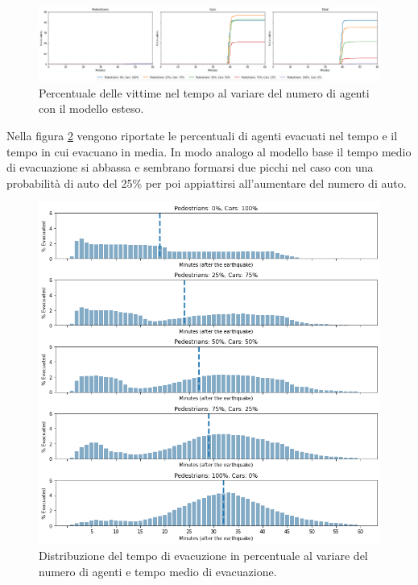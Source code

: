 \begin{figure}[ht]
    \centering
    \includegraphics[width=\textwidth]{images/analisi/new-casualties.png}
    \caption{Percentuale delle vittime nel tempo al variare del numero di agenti con il modello esteso.}
    \label{fig:analisi-new-casualties}
\end{figure}


Nella figura \ref{fig:analisi-new-evtimes} vengono riportate le percentuali di agenti evacuati nel tempo
e il tempo in cui evacuano in media.
%
In modo analogo al modello base il tempo medio di evacuazione si abbassa e sembrano formarsi due picchi nel caso con una probabilità di auto del 25\% per poi appiattirsi
all'aumentare del numero di auto.


\begin{figure}
    \centering
    \includegraphics[width=\textwidth]{images/analisi/new-evtimes.png}
    \caption{Distribuzione del tempo di evacuzione in percentuale al variare del numero di agenti e tempo medio di evacuazione.}
    \label{fig:analisi-new-evtimes}
\end{figure}

